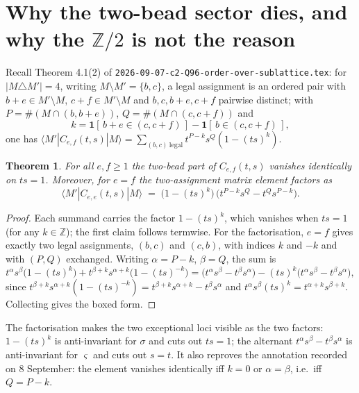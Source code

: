 \documentclass[11pt]{article}
\newtheorem{theorem}{Theorem}
\theoremstyle{definition}
\newcommand{\Z}{\mathbb{Z}}
\begin{document}
\section{Why the two-bead sector dies, and why the $\Z/2$ is not the reason}

Recall Theorem 4.1(2) of \texttt{2026-09-07-c2-Q96-order-over-sublattice.tex}: for
$|M\triangle M'|=4$, writing $M\setminus M'=\{b,c\}$, a legal assignment is an ordered
pair with $b+e\in M'\setminus M$, $c+f\in M'\setminus M$ and $b,c,b+e,c+f$ pairwise
distinct; with $P=\#(M\cap(b,b+e))$, $Q=\#(M\cap(c,c+f))$ and
\[
  k=\mathbf 1[\,b+e\in(c,c+f)\,]-\mathbf 1[\,b\in(c,c+f)\,],
\]
one has
$\langle M'|C_{e,f}(t,s)|M\rangle=\sum_{(b,c)\ \mathrm{legal}}t^{P-k}s^{Q}(1-(ts)^{k})$.

\begin{theorem}\label{thm:D}
For all $e,f\ge1$ the two-bead part of $C_{e,f}(t,s)$ vanishes identically on
$ts=1$.  Moreover, for $e=f$ the two-assignment matrix element factors as
\[
  \boxed{\ \langle M'|C_{e,e}(t,s)|M\rangle
  \;=\;\bigl(1-(ts)^{k}\bigr)\,\bigl(t^{P-k}s^{Q}-t^{Q}s^{P-k}\bigr).\ }
\]
\end{theorem}

\begin{proof}
Each summand carries the factor $1-(ts)^k$, which vanishes when $ts=1$ (for any
$k\in\Z$); the first claim follows termwise.  For the factorisation, $e=f$ gives
exactly two legal assignments, $(b,c)$ and $(c,b)$, with indices $k$ and $-k$ and
with $(P,Q)$ exchanged.  Writing $\alpha=P-k$, $\beta=Q$, the sum is
\[
  t^{\alpha}s^{\beta}\bigl(1-(ts)^k\bigr)+t^{\beta+k}s^{\alpha+k}\bigl(1-(ts)^{-k}\bigr)
  = \bigl(t^{\alpha}s^{\beta}-t^{\beta}s^{\alpha}\bigr)-(ts)^k
    \bigl(t^{\alpha}s^{\beta}-t^{\beta}s^{\alpha}\bigr),
\]
since $t^{\beta+k}s^{\alpha+k}(1-(ts)^{-k})=t^{\beta+k}s^{\alpha+k}-t^{\beta}s^{\alpha}$
and $t^{\alpha}s^{\beta}(ts)^k=t^{\alpha+k}s^{\beta+k}$.  Collecting gives the boxed
form.
\end{proof}

The factorisation makes the two exceptional loci visible as the two factors:
$1-(ts)^k$ is anti-invariant for $\sigma$ and cuts out $ts=1$; the alternant
$t^{\alpha}s^{\beta}-t^{\beta}s^{\alpha}$ is anti-invariant for $\varsigma$ and cuts
out $s=t$.  It also reproves the annotation recorded on 8 September: the element
vanishes identically iff $k=0$ or $\alpha=\beta$, i.e.\ iff $Q=P-k$.
\end{document}
